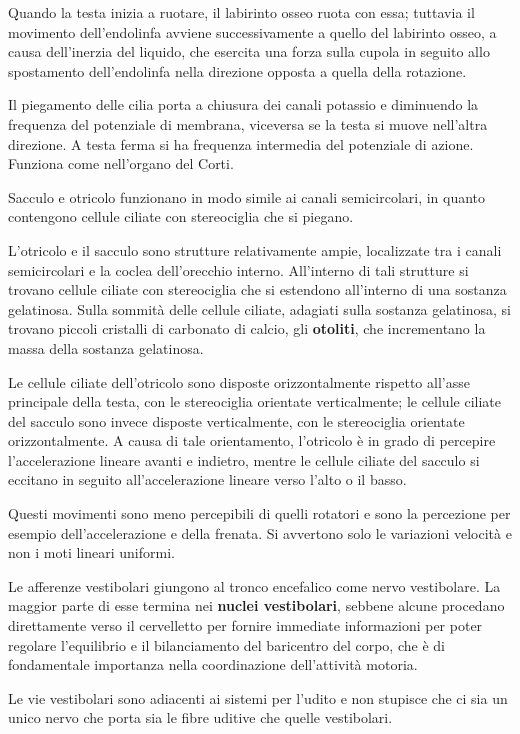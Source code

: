 \documentclass[]{article}
\begin{document}
Quando la testa inizia a ruotare, il labirinto osseo ruota con essa;
tuttavia il movimento dell'endolinfa avviene successivamente a quello
del labirinto osseo, a causa dell'inerzia del liquido, che esercita una
forza sulla cupola in seguito allo spostamento dell'endolinfa nella
direzione opposta a quella della rotazione.

Il piegamento delle cilia porta a chiusura dei canali potassio e
diminuendo la frequenza del potenziale di membrana, viceversa se la
testa si muove nell'altra direzione. A testa ferma si ha frequenza
intermedia del potenziale di azione. Funziona come nell'organo del
Corti.

Sacculo e otricolo funzionano in modo simile ai canali semicircolari, in
quanto contengono cellule ciliate con stereociglia che si piegano.

L'otricolo e il sacculo sono strutture relativamente ampie, localizzate
tra i canali semicircolari e la coclea dell'orecchio interno.
All'interno di tali strutture si trovano cellule ciliate con
stereociglia che si estendono all'interno di una sostanza gelatinosa.
Sulla sommità delle cellule ciliate, adagiati sulla sostanza gelatinosa,
si trovano piccoli cristalli di carbonato di calcio, gli
\textbf{otoliti}, che incrementano la massa della sostanza gelatinosa.

Le cellule ciliate dell'otricolo sono disposte orizzontalmente rispetto
all'asse principale della testa, con le stereociglia orientate
verticalmente; le cellule ciliate del sacculo sono invece disposte
verticalmente, con le stereociglia orientate orizzontalmente. A causa di
tale orientamento, l'otricolo è in grado di percepire l'accelerazione
lineare avanti e indietro, mentre le cellule ciliate del sacculo si
eccitano in seguito all'accelerazione lineare verso l'alto o il basso.

Questi movimenti sono meno percepibili di quelli rotatori e sono la
percezione per esempio dell'accelerazione e della frenata. Si avvertono
solo le variazioni velocità e non i moti lineari uniformi.

Le afferenze vestibolari giungono al tronco encefalico come nervo
vestibolare. La maggior parte di esse termina nei \textbf{nuclei
vestibolari}, sebbene alcune procedano direttamente verso il cervelletto
per fornire immediate informazioni per poter regolare l'equilibrio e il
bilanciamento del baricentro del corpo, che è di fondamentale importanza
nella coordinazione dell'attività motoria.

Le vie vestibolari sono adiacenti ai sistemi per l'udito e non stupisce
che ci sia un unico nervo che porta sia le fibre uditive che quelle
vestibolari.
\end{document}
